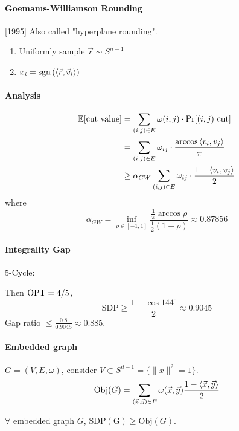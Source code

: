 \paragraph{Goemams-Williamson Rounding}[1995]
Also called "hyperplane rounding".

\begin{enumerate}
    \item Uniformly sample  $ \vec{r}\sim S^{n-1} $
    \item  $ x_i=\mathrm{sgn}\left(\left<\vec{r},\vec{v}_i\right>\right) $  
\end{enumerate}

\paragraph{Analysis}
\[\begin{aligned}
    \mathbb E[\text{cut value}]&=\sum_{(i,j)\in E}\omega(i,j)\cdot\mathrm{Pr}[(i,j)\text{ cut}]\\
    &=\sum_{(i,j)\in E}\omega_{ij}\cdot\frac{\arccos\left<v_i,v_j\right>}{\pi}\\
    & \geq \alpha_{GW}\sum_{(i,j)\in E}\omega_{ij}\cdot\frac{1-\left<v_i,v_j\right>}{2}
\end{aligned}\]
where 
\[\alpha_{GW}=\inf_{\rho\in[-1,1]}\frac{\frac{1}{\pi}\arccos\rho}{\frac{1}{2}(1-\rho)}\approx 0.87856\]

\paragraph{Integrality Gap}

$ 5 $-Cycle:

\begin{center}
\end{center}

Then  $ \mathrm{OPT}=4/5 $, 
\[\mathrm{SDP} \geq \frac{1-\cos 144^\circ}{2}\approx 0.9045\]
Gap ratio  $  \leq \frac{0.8}{0.9045}\approx 0.885 $.

\paragraph{Embedded graph}  $ G=(V,E, \omega) $, consider  $ V\subset S^{d-1}=\{\|x\|^2=1\} $.
\[\mathrm{Obj}(G)=\sum_{(\vec{x},\vec{y})\in E}\omega(\vec{x},\vec{y})\frac{1-\left<\vec{x},\vec{y}\right>}{2}\]
\begin{fact}
    $ \forall  $ embedded graph  $ G $,  $ \mathrm{SDP(G)} \geq \mathrm{Obj}(G) $. 
\end{fact}  

